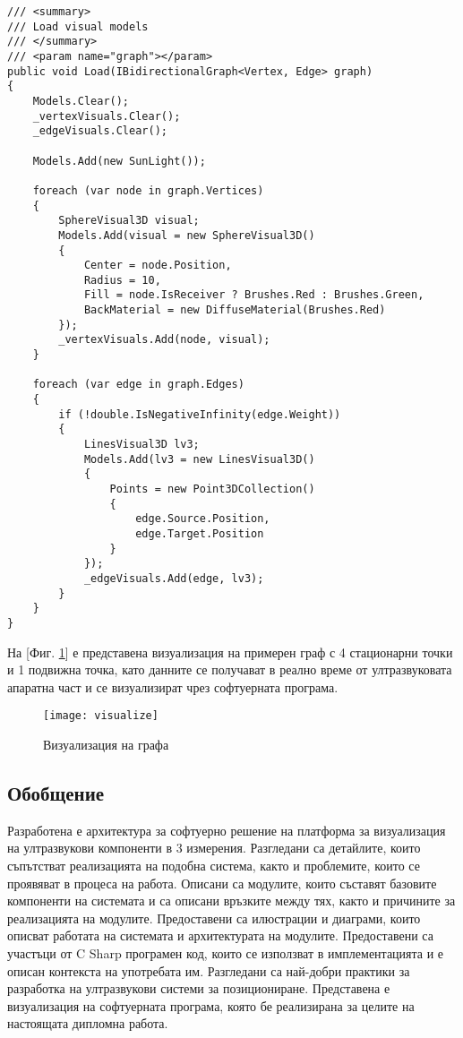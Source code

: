 \begin{lstlisting}
/// <summary>
/// Load visual models
/// </summary>
/// <param name="graph"></param>
public void Load(IBidirectionalGraph<Vertex, Edge> graph)
{
    Models.Clear();
    _vertexVisuals.Clear();
    _edgeVisuals.Clear();

    Models.Add(new SunLight());

    foreach (var node in graph.Vertices)
    {
        SphereVisual3D visual;
        Models.Add(visual = new SphereVisual3D()
        {
            Center = node.Position,
            Radius = 10,
            Fill = node.IsReceiver ? Brushes.Red : Brushes.Green,
            BackMaterial = new DiffuseMaterial(Brushes.Red)
        });
        _vertexVisuals.Add(node, visual);
    }

    foreach (var edge in graph.Edges)
    {
        if (!double.IsNegativeInfinity(edge.Weight))
        {
            LinesVisual3D lv3;
            Models.Add(lv3 = new LinesVisual3D()
            {
                Points = new Point3DCollection()
                {
                    edge.Source.Position,
                    edge.Target.Position
                }
            });
            _edgeVisuals.Add(edge, lv3);
        }
    }
}
\end{lstlisting}



На [Фиг. \ref{fig:visualize}] е представена визуализация на примерен граф с 4 стационарни точки и 1 подвижна точка, като данните се получават в реално време от ултразвуковата апаратна част и се визуализират чрез софтуерната програма.

\begin{figure}
    \centerline{\texttt{[image: visualize]}}
    \caption{Визуализация на графа}
    \label{fig:visualize}
\end{figure}

\subsection{Обобщение}
Разработена е архитектура за софтуерно решение на платформа за визуализация на ултразвукови компоненти в 3 измерения. Разгледани са детайлите, които съпътстват реализацията на подобна система, както и проблемите, които се проявяват в процеса на работа. Описани са модулите, които съставят базовите компоненти на системата и са описани връзките между тях, както и причините за реализацията на модулите. Предоставени са илюстрации и диаграми, които описват работата на системата и архитектурата на модулите. Предоставени са участъци от C Sharp програмен код, които се използват в имплементацията и е описан контекста на употребата им. Разгледани са най-добри практики за разработка на ултразвукови системи за позициониране. Представена е визуализация на софтуерната програма, която бе реализирана за целите на настоящата дипломна работа.
